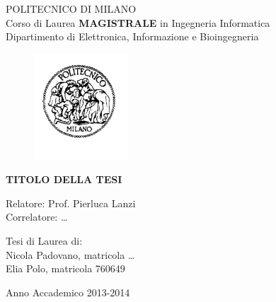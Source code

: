 \thispagestyle{empty}
\vspace*{-1.5cm} \bfseries{
\begin{center}
  \large
  POLITECNICO DI MILANO\\
  \normalsize
  Corso di Laurea \textbf{MAGISTRALE} in Ingegneria Informatica\\
  Dipartimento di Elettronica, Informazione e Bioingegneria\\
  \begin{figure}[htbp]
    \begin{center}
      \includegraphics[width=3.5cm]{./pictures/logopm}
    \end{center}
  \end{figure}
  \vspace*{0.3cm} \LARGE



  \textbf{TITOLO DELLA TESI}\\



\end{center}
\vspace*{3.0cm} \large
\begin{flushleft}


  Relatore: Prof. Pierluca Lanzi \\
  Correlatore: \dots

\end{flushleft}
\vspace*{1.0cm}
\begin{flushright}


  Tesi di Laurea di:\\ Nicola Padovano, matricola \dots \\ 
		       Elia Polo, matricola 760649 \\


\end{flushright}
\vspace*{0.5cm}
\begin{center}



  Anno Accademico 2013-2014
\end{center} \clearpage
}
